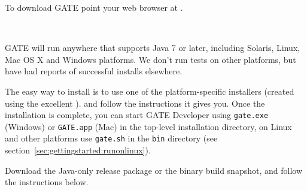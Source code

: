 



To download GATE point your web browser at
.



\mbox{ }

GATE will run anywhere that supports Java 7 or later, including Solaris, Linux,
Mac OS X and Windows platforms. We don't run tests on other platforms, but have
had reports of successful installs elsewhere.


The easy way to install is to use one of the platform-specific installers
(created using the excellent ).
 and follow the instructions it gives
you. Once the installation is complete, you can start GATE Developer using
\verb|gate.exe| (Windows) or \verb|GATE.app| (Mac) in the top-level
installation directory, on Linux and other platforms use \verb|gate.sh| 
in the \texttt{bin} directory (see section~\ref{sec:gettingstarted:runonlinux}).


Download the Java-only release package or the binary build snapshot, and follow 
the instructions below.

